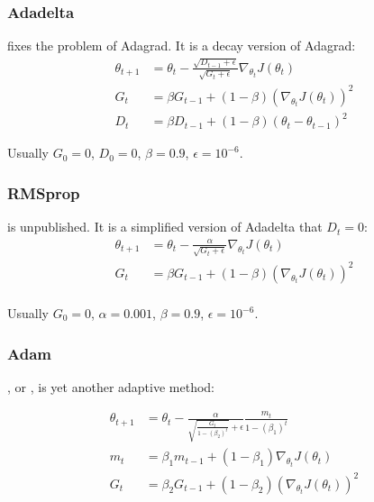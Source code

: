 \subsubsection{Adadelta}
\cite{Zeiler2012} fixes the problem of Adagrad. It is a decay version of Adagrad:
\begin{equation}
    \begin{aligned}
        \theta_{t+1} &= \theta_t - \frac{\sqrt{D_{t-1} + \epsilon}}{\sqrt{G_t + \epsilon}}  \nabla_{\theta_t} J(\theta_t) \\
        G_t &= \beta G_{t-1} + (1-\beta) \left(\nabla_{\theta_t} J(\theta_t) \right)^2 \\
        D_t &= \beta D_{t-1} + (1-\beta) (\theta_t - \theta_{t-1})^2
    \end{aligned}
\end{equation}

Usually $G_0 = 0$, $D_0 = 0$, $\beta = 0.9$, $\epsilon = 10^{-6}$.

\subsubsection{RMSprop}

 is unpublished. It is a simplified version of Adadelta that $D_t = 0$:
\begin{equation}
    \begin{aligned}
        \theta_{t+1} &= \theta_t - \frac{\alpha}{\sqrt{G_t + \epsilon}}  \nabla_{\theta_t} J(\theta_t) \\
        G_t &= \beta G_{t-1} + (1-\beta) \left(\nabla_{\theta_t} J(\theta_t) \right)^2 \\
    \end{aligned}
\end{equation}

Usually $G_0 = 0$, $\alpha = 0.001$, $\beta = 0.9$, $\epsilon = 10^{-6}$.




\subsubsection{Adam}

\cite{Kingma2015}, or , is yet another adaptive method:

\begin{equation}
    \begin{aligned}
        \theta_{t+1} &= \theta_t - \frac{\alpha}{\sqrt{\displaystyle \frac{G_t}{1-(\beta_2)^t}} + \epsilon} \frac{m_t}{1-(\beta_1)^t}  \\
        m_t &= \beta_1 m_{t-1} + (1-\beta_1) \nabla_{\theta_t} J(\theta_t) \\
        G_t &= \beta_2 G_{t-1} + (1-\beta_2) \left(\nabla_{\theta_t} J(\theta_t) \right)^2
    \end{aligned}
\end{equation}

